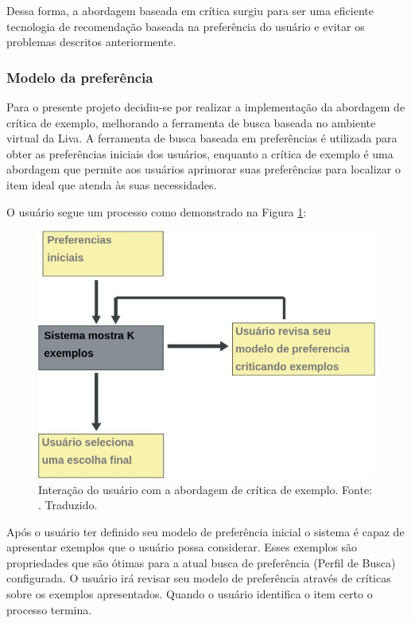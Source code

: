 Dessa forma, a abordagem baseada em crítica surgiu para ser uma eficiente tecnologia de recomendação baseada na preferência do usuário e evitar os problemas descritos anteriormente.

\subsubsection{Modelo da preferência}

Para o presente projeto decidiu-se por realizar a implementação da abordagem de crítica de exemplo, melhorando a ferramenta de busca baseada no ambiente virtual da Liva. A ferramenta de busca baseada em preferências é utilizada para obter as preferências iniciais dos usuários, enquanto a crítica de exemplo é uma abordagem que permite aos usuários aprimorar suas preferências para localizar o item ideal que atenda às suas necessidades.

O usuário segue um processo como demonstrado na Figura \ref{fig:exemple-critiquing}:

\begin{figure}[H]
    \centering
    \includegraphics[scale=0.5]{figuras/proposta/exemple-critiquing.png}
    \caption[Interação do usuário com a abordagem de crítica de exemplo]{Interação do usuário com a abordagem de crítica de exemplo. Fonte: \cite{Viappiani}. Traduzido.}
    \label{fig:exemple-critiquing}
\end{figure}

Após o usuário ter definido seu modelo de preferência inicial o sistema é capaz de apresentar exemplos que o usuário possa considerar. Esses exemplos são propriedades que são ótimas para a atual busca de preferência (Perfil de Busca) configurada. O usuário irá revisar seu modelo de preferência através de críticas sobre os exemplos apresentados. Quando o usuário identifica o item certo o processo termina.

